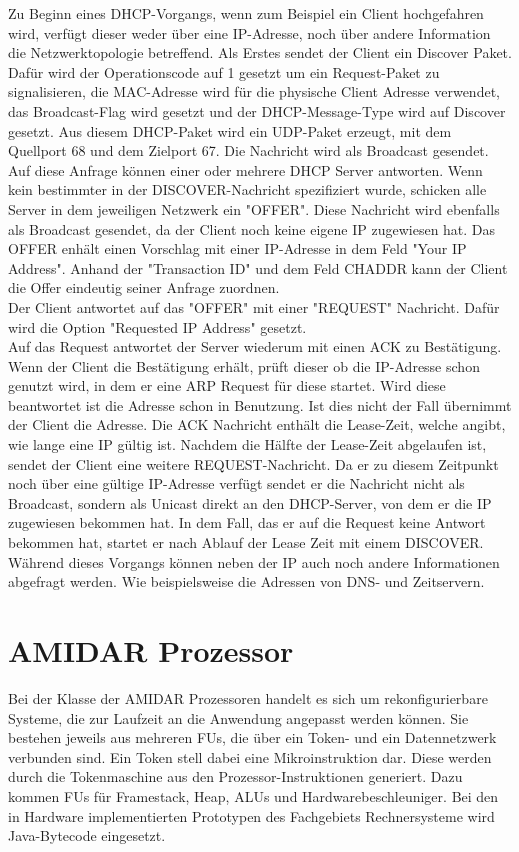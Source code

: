 Zu Beginn eines DHCP-Vorgangs, wenn zum Beispiel ein Client hochgefahren wird, verfügt dieser weder über eine IP-Adresse, noch über andere Information die Netzwerktopologie betreffend. Als Erstes sendet der Client ein Discover Paket. Dafür wird der Operationscode auf 1 gesetzt um ein Request-Paket zu signalisieren, die MAC-Adresse wird für die physische Client Adresse verwendet, das Broadcast-Flag wird gesetzt und der DHCP-Message-Type wird auf Discover gesetzt. Aus diesem DHCP-Paket wird ein UDP-Paket erzeugt, mit dem Quellport  68 und dem Zielport 67. Die Nachricht wird als Broadcast gesendet. \\
Auf diese Anfrage können einer oder mehrere DHCP Server antworten. Wenn kein bestimmter in der DISCOVER-Nachricht spezifiziert wurde, schicken alle Server in dem jeweiligen Netzwerk ein "{}OFFER". Diese Nachricht wird ebenfalls als Broadcast gesendet, da der Client noch keine eigene IP zugewiesen hat. Das OFFER enhält einen Vorschlag mit einer IP-Adresse in dem Feld "Your IP Address". Anhand der "Transaction ID"{} und dem Feld CHADDR kann der Client die Offer eindeutig seiner Anfrage zuordnen. \\
Der Client antwortet auf das "{}OFFER"{} mit einer "REQUEST"{} Nachricht. Dafür wird die Option "Requested IP Address"{} gesetzt. \\
Auf das Request antwortet der Server wiederum mit einen ACK zu Bestätigung. Wenn der Client die Bestätigung erhält, prüft dieser ob die IP-Adresse schon genutzt wird, in dem er eine ARP Request für diese startet. Wird diese beantwortet ist die Adresse schon in Benutzung. Ist dies nicht der Fall übernimmt der Client die Adresse. 
Die ACK Nachricht enthält die Lease-Zeit, welche angibt, wie lange eine IP gültig ist. 
Nachdem die Hälfte der Lease-Zeit abgelaufen ist, sendet der Client eine weitere REQUEST-Nachricht. Da er zu diesem Zeitpunkt noch über eine gültige IP-Adresse verfügt sendet er die Nachricht nicht als Broadcast, sondern als Unicast direkt an den DHCP-Server, von dem er die IP zugewiesen bekommen hat. In dem Fall, das er auf die Request keine Antwort bekommen hat, startet er nach Ablauf der Lease Zeit mit einem DISCOVER.\\
Während dieses Vorgangs können neben der IP auch noch andere Informationen abgefragt werden. Wie beispielsweise die Adressen von DNS- und Zeitservern.





\section{AMIDAR Prozessor}
Bei der Klasse der AMIDAR Prozessoren handelt es sich um rekonfigurierbare Systeme, die zur Laufzeit an die Anwendung angepasst werden können. Sie bestehen jeweils aus mehreren FUs, die über ein Token- und ein Datennetzwerk verbunden sind. Ein Token stell dabei eine Mikroinstruktion dar. Diese werden durch die Tokenmaschine aus den Prozessor-Instruktionen generiert. Dazu kommen FUs für Framestack, Heap, ALUs und Hardwarebeschleuniger. Bei den in Hardware implementierten Prototypen des Fachgebiets Rechnersysteme wird Java-Bytecode eingesetzt.
